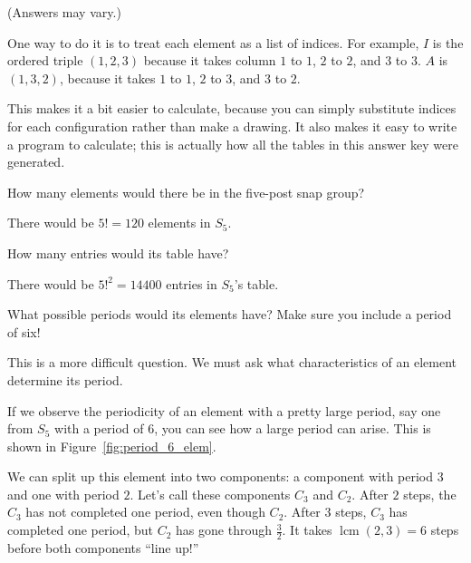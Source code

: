 \documentclass[../gatm_answers.tex]{subfiles}
\begin{document}
\noindent (Answers may vary.)

One way to do it is to treat each element as a list of indices. For example, $I$ is the ordered triple $(1,2,3)$ because it takes column $1$ to $1$, $2$ to $2$, and $3$ to $3$. $A$ is $(1,3,2)$, because it takes $1$ to $1$, $2$ to $3$, and $3$ to $2$.

This makes it a bit easier to calculate, because you can simply substitute indices for each configuration rather than make a drawing. It also makes it easy to write a program to calculate; this is actually how all the tables in this answer key were generated.

\begin{outer_problem}
\item

\begin{inner_problem}[start=1,leftmargin=25pt]
\item How many elements would there be in the five-post snap group? \label{prob:five_post_snap_list_start}
\end{inner_problem}
\end{outer_problem}

\noindent There would be $5!=120$ elements in $S_5$.

\begin{inner_problem}
	\item How many entries would its table have?
\end{inner_problem}

\noindent There would be $5!^2=14400$ entries in $S_5$'s table.

\begin{inner_problem}
\item What possible periods would its elements have? Make sure you include a period of six! \label{prob:five_post_snap_list_end}
\end{inner_problem}

\noindent This is a more difficult question. We must ask what characteristics of an element determine its period.

If we observe the periodicity of an element with a pretty large period, say one from $S_5$ with a period of $6$, you can see how a large period can arise. This is shown in Figure~\ref{fig:period_6_elem}.

We can split up this element into two components: a component with period $3$ and one with period $2$. Let's call these components $C_3$ and $C_2$. After $2$ steps, the $C_3$ has not completed one period, even though $C_2$. After $3$ steps, $C_3$ has completed one period, but $C_2$ has gone through $\frac{3}{2}$. It takes $\operatorname{lcm}(2,3) = 6$ steps before both components ``line up!''
\end{document}
